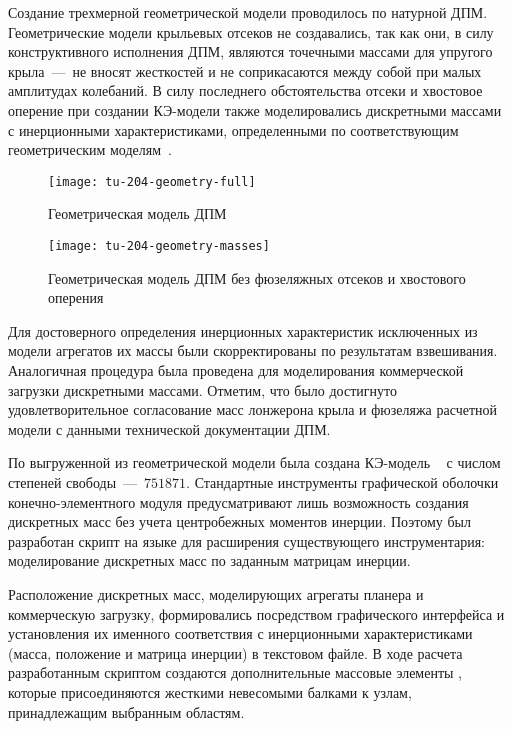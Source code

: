 Создание трехмерной геометрической модели  проводилось по натурной ДПМ. Геометрические модели крыльевых отсеков не создавались, так как они, в силу конструктивного исполнения ДПМ, являются точечными массами для упругого крыла~---~не вносят жесткостей и не соприкасаются между собой при малых амплитудах колебаний. В силу последнего обстоятельства отсеки и хвостовое оперение при создании КЭ-модели также моделировались дискретными массами с инерционными характеристиками, определенными по соответствующим геометрическим моделям~. 

\begin{figure}[!htb]
	\centerfloat
	\texttt{[image: tu-204-geometry-full]}
	\caption{Геометрическая модель ДПМ} \label{fig:tu-204-geometry-full}
\end{figure}

\begin{figure}[!htb]
	\centerfloat
	\texttt{[image: tu-204-geometry-masses]}
	\caption{Геометрическая модель ДПМ без фюзеляжных отсеков и хвостового оперения} \label{fig:tu-204-geometry-masses}
\end{figure}

Для достоверного определения инерционных характеристик исключенных из модели агрегатов их массы были скорректированы по результатам взвешивания. Аналогичная процедура была проведена для моделирования коммерческой загрузки дискретными массами. Отметим, что было достигнуто удовлетворительное согласование масс лонжерона крыла и фюзеляжа расчетной модели с данными технической документации ДПМ.

По выгруженной из  геометрической модели была создана КЭ-модель ~ с числом степеней свободы~---~$ 751871 $. Стандартные инструменты графической оболочки конечно-элементного модуля  предусматривают лишь возможность создания дискретных масс без учета центробежных моментов инерции. Поэтому был разработан скрипт на языке  для расширения существующего инструментария: моделирование дискретных масс по заданным матрицам инерции. 

Расположение дискретных масс, моделирующих агрегаты планера и коммерческую загрузку, формировались посредством графического интерфейса  и установления их именного соответствия с инерционными характеристиками (масса, положение и матрица инерции) в текстовом файле. В ходе расчета разработанным скриптом создаются дополнительные массовые элементы , которые присоединяются жесткими невесомыми балками к узлам, принадлежащим выбранным областям. 

